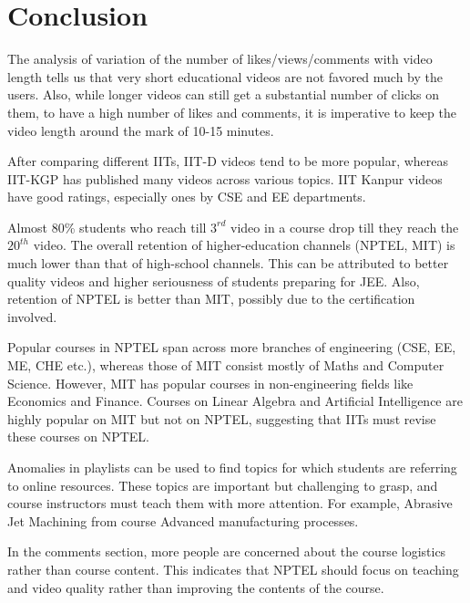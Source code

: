 \documentclass{article}
\begin{document}
\section{Conclusion}
The analysis of variation of the number of likes/views/comments with video length tells us that very short educational videos are not favored much by the users. Also, while longer videos can still get a substantial number of clicks on them, to have a high number of likes and comments, it is imperative to keep the video length around the mark of 10-15 minutes.

After comparing different IITs, IIT-D videos tend to be more popular, whereas IIT-KGP has published many videos across various topics. IIT Kanpur videos have good ratings, especially ones by CSE and EE departments.

Almost 80\% students who reach till $3^{rd}$ video in a course drop till they reach the $20^{th}$ video. The overall retention of higher-education channels (NPTEL, MIT) is much lower than that of high-school channels. This can be attributed to better quality videos and higher seriousness of students preparing for JEE. Also, retention of NPTEL is better than MIT, possibly due to the certification involved.

Popular courses in NPTEL span across more branches of engineering (CSE, EE, ME, CHE etc.), whereas those of MIT consist mostly of Maths and Computer Science. However, MIT has popular courses in non-engineering fields like Economics and Finance. Courses on Linear Algebra and Artificial Intelligence are highly popular on MIT but not on NPTEL, suggesting that IITs must revise these courses on NPTEL.

Anomalies in playlists can be used to find topics for which students are referring to online resources. These topics are important but challenging to grasp, and course instructors must teach them with more attention. For example, Abrasive Jet Machining from course Advanced manufacturing processes.

In the comments section, more people are concerned about the course logistics rather than course content. This indicates that NPTEL should focus on teaching and video quality rather than improving the contents of the course.

\end{document}
